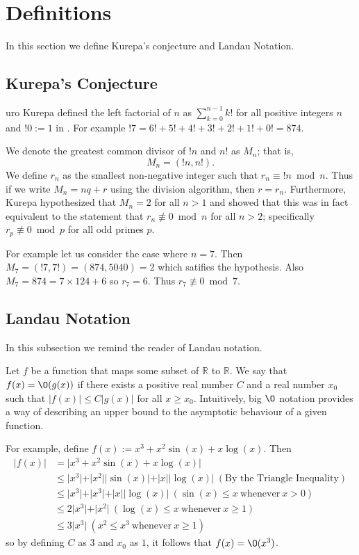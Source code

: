 \section{Definitions} 

In this section we define Kurepa's conjecture and Landau Notation.

\subsection{Kurepa's Conjecture}

{\DJ}uro Kurepa defined the left factorial of $n$ as $\sum_{k=0}^{n-1} k! $ for 
all positive integers $n$ and $!0:=1$ in \cite{Kur71}. For example $!7=6!+5!+4!+3!+2!+1!+0!=874$.

We denote the greatest common divisor of $!n$ and $n!$ as $M_n$; that is, $$M_n=(!n, n!).$$ We 
define $r_n$ as the smallest non-negative integer such that $r_n \equiv !n \bmod n$. 
Thus if we write $M_n=nq+r$ using the division algorithm, then $r=r_n$. 
Furthermore, Kurepa hypothesized that $M_n=2$ for all $n>1$ and showed that this was in fact 
equivalent to the statement that $r_n\not\equiv 0\bmod n$ for all $n>2$; specifically 
$r_p\not\equiv 0\bmod p$ for all odd primes $p$. 

For example let us consider the case where $n=7$. Then $M_7=(!7,7!)=(874, 5040)=2$ which
satifies the hypothesis. Also $M_7=874=7\times 124+6$ so $r_7=6$. Thus $r_7\not\equiv 0 \bmod 7$.

\subsection{Landau Notation}

In this subsection we remind the reader of Landau  notation.
 

Let $f$ be a function that maps some subset of $\mathbb{R}$ to $\mathbb{R}$. We say that 
$f(x)=\O(g(x))$ if there exists a positive real number $C$ and a real number $x_0$ such that
$\vert f(x) \vert \leq C\vert g(x)\vert$ for all $x\geq x_0$. Intuitively, big $\O$  notation
provides a way of describing an upper bound to the asymptotic behaviour of a given function.

For example, define $f(x):=x^3+x^2\sin(x)+x\log(x)$. Then 
\begin{align*} \vert f(x)\vert &=\vert x^3+x^2\sin(x)+x\log(x) \vert \\
&\leq \vert x^3\vert +\vert x^2\vert\vert\sin(x)\vert+\vert x\vert \vert\log(x)\vert \  (\textrm{By the Triangle Inequality})\\
&\leq \vert x^3\vert +\vert x^3\vert +\vert x\vert\vert\log(x)\vert \ (\sin(x) \leq x \ \textrm{whenever} \ x>0)\\
&\leq 2\vert x^3\vert+\vert x^2\vert \ (\log(x) \leq x \ \textrm{whenever} \ x\geq1) \\
&\leq 3 \vert x^3 \vert \  (x^2\leq x^3 \ \textrm{whenever} \ x\geq1)
\end{align*}
so by defining $C$ as 3 and $x_0$ as $1$, it follows that $f(x)=\O(x^3)$.

